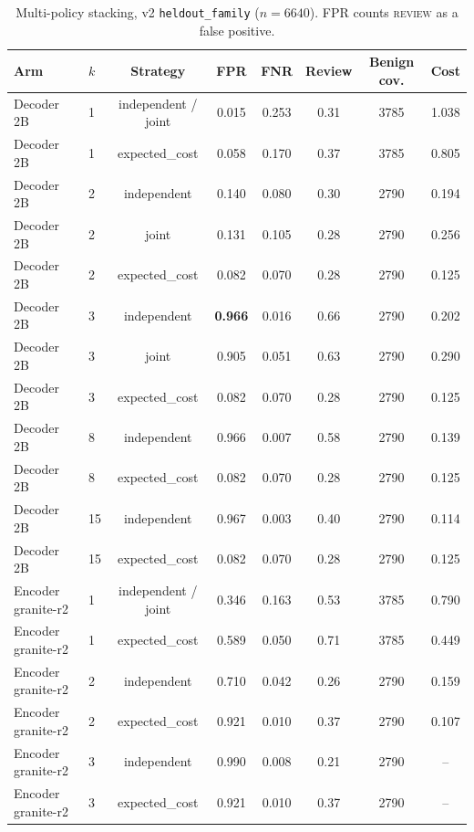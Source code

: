 \begin{table}[t]
\centering
\small
\caption{Multi-policy stacking, v2 \texttt{heldout\_family} ($n{=}6640$). FPR counts \textsc{review} as a false positive.}
\label{tab:stacking-full}
\begin{tabular}{llcccccc}
\toprule
Arm & $k$ & Strategy & FPR & FNR & Review & Benign cov. & Cost \\
\midrule
Decoder 2B & 1 & independent / joint & 0.015 & 0.253 & 0.31 & 3785 & 1.038 \\
Decoder 2B & 1 & expected\_cost & 0.058 & 0.170 & 0.37 & 3785 & 0.805 \\
Decoder 2B & 2 & independent & 0.140 & 0.080 & 0.30 & 2790 & 0.194 \\
Decoder 2B & 2 & joint & 0.131 & 0.105 & 0.28 & 2790 & 0.256 \\
Decoder 2B & 2 & expected\_cost & 0.082 & 0.070 & 0.28 & 2790 & 0.125 \\
Decoder 2B & 3 & independent & \textbf{0.966} & 0.016 & 0.66 & 2790 & 0.202 \\
Decoder 2B & 3 & joint & 0.905 & 0.051 & 0.63 & 2790 & 0.290 \\
Decoder 2B & 3 & expected\_cost & 0.082 & 0.070 & 0.28 & 2790 & 0.125 \\
Decoder 2B & 8 & independent & 0.966 & 0.007 & 0.58 & 2790 & 0.139 \\
Decoder 2B & 8 & expected\_cost & 0.082 & 0.070 & 0.28 & 2790 & 0.125 \\
Decoder 2B & 15 & independent & 0.967 & 0.003 & 0.40 & 2790 & 0.114 \\
Decoder 2B & 15 & expected\_cost & 0.082 & 0.070 & 0.28 & 2790 & 0.125 \\
\midrule
Encoder granite-r2 & 1 & independent / joint & 0.346 & 0.163 & 0.53 & 3785 & 0.790 \\
Encoder granite-r2 & 1 & expected\_cost & 0.589 & 0.050 & 0.71 & 3785 & 0.449 \\
Encoder granite-r2 & 2 & independent & 0.710 & 0.042 & 0.26 & 2790 & 0.159 \\
Encoder granite-r2 & 2 & expected\_cost & 0.921 & 0.010 & 0.37 & 2790 & 0.107 \\
Encoder granite-r2 & 3 & independent & 0.990 & 0.008 & 0.21 & 2790 & -- \\
Encoder granite-r2 & 3 & expected\_cost & 0.921 & 0.010 & 0.37 & 2790 & -- \\
\bottomrule
\end{tabular}
\end{table}

